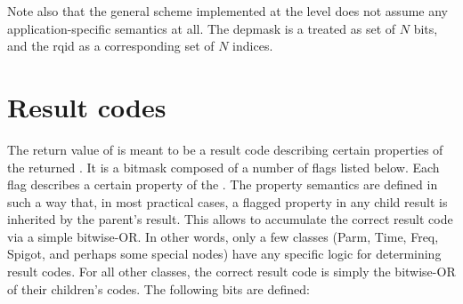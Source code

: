   Note also that the general scheme implemented at the  level does not
  assume any application-specific semantics at all. The depmask is a treated as
  set of $N$ bits, and the rqid as a corresponding set of $N$ indices.

\section{Result codes}

  The return value of  is meant to be a result code describing
  certain properties  of the returned \Result. It is a bitmask composed of a
  number of flags listed below. Each flag describes a certain property of the
  \Result. The property semantics are defined in such a way that, in most
  practical cases, a flagged property in any child result is inherited by the
  parent's result. This allows  to accumulate the correct result
  code via a simple bitwise-OR. In other words, only a few classes (Parm, Time,
  Freq, Spigot, and perhaps some special nodes) have any specific logic for
  determining result codes. For all other classes, the correct result code is
  simply the bitwise-OR of their children's codes. The following bits are
  defined:
  
